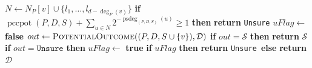 \documentclass[a4paper,11pt,oneside]{scrartcl}
\theoremstyle{definition}
\theoremstyle{remark}
\DeclareMathOperator{\pccgsdeg}{psdeg}
\DeclareMathOperator{\pccpot}{pccpot}
\newcommand{\unsure}{\texttt{Unsure}}
\begin{document}
\begin{algorithm}[H]
\begin{algorithmic}[1]
                \STATE $N \gets N_P[v] \cup \{l_1, \dots, l_{d - \deg_P(v)}\}$
                \STATE \textbf{if} $\pccpot(P,D,S) + \sum_{u \in N} 2^{-\pccgsdeg_{(P,D,S)}(u)} \geq 1$ \textbf{then} \textbf{return} \unsure\label{algorithm_line:potential_outcome_Staller_L_loop_return}
            \ENDFOR
            \STATE $uFlag \gets$ \textbf{false}
                \STATE $out \gets \textsc{PotentialOutcome}((P, D, S \cup \{v\}), \mathcal D)$ \label{algorithm_line:potential_outcome_Staller_rec_call}
                \STATE \textbf{if} $out = \mathcal S$ \textbf{then} \textbf{return} $\mathcal S$ \label{algorithm_line:potential_outcome_Staller_return_after_rec_call}
                \STATE \textbf{if} $out = \unsure$ \textbf{then} $uFlag \gets$ \textbf{true}
            \ENDFOR
            \STATE \textbf{if} $uFlag$ \textbf{then} \textbf{return} \unsure\ \textbf{else} \textbf{return} $\mathcal D$ \label{algorithm_line:potential_outcome_Staller_final_return}
        \ENDIF
    \end{algorithmic}
\end{algorithm}
\end{document}
